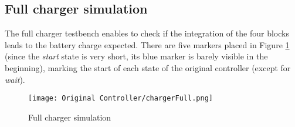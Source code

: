 \documentclass[12pt]{article}
\begin{document}
 
 





\subsection{Full charger simulation}

The full charger testbench enables to check if the integration of the four blocks leads to the battery charge expected. There are five markers placed in Figure \ref{fig:orig_full_charger} (since the \textit{start} state is very short, its blue marker is barely visible in the beginning), marking the start of each state of the original controller (except for \textit{wait}).

\begin{figure}[H]
\centering 
\texttt{[image: Original Controller/chargerFull.png]}
\caption{Full charger simulation}
\label{fig:orig_full_charger}
\end{figure}
\end{document}
